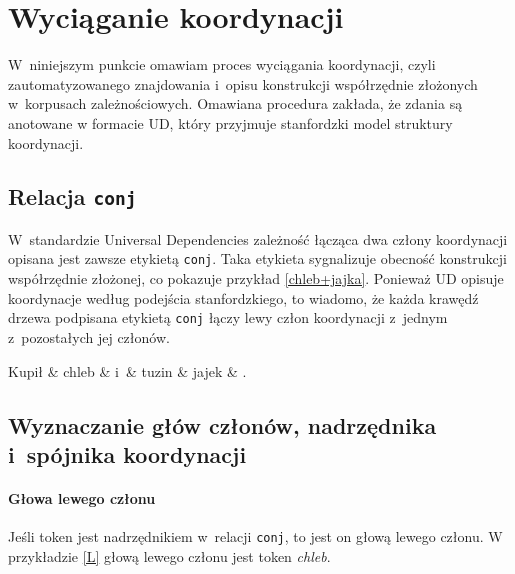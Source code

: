 \section{Wyciąganie koordynacji}

W~niniejszym punkcie omawiam proces wyciągania koordynacji, czyli zautomatyzowanego znajdowania i~opisu konstrukcji współrzędnie złożonych w~korpusach zależnościowych. Omawiana procedura zakłada, że zdania są anotowane w formacie UD, który przyjmuje stanfordzki model struktury koordynacji.

\subsection{Relacja \texttt{conj}}

W~standardzie Universal Dependencies zależność łącząca dwa człony koordynacji opisana jest zawsze etykietą \texttt{conj}. Taka etykieta sygnalizuje obecność konstrukcji współrzędnie złożonej, co pokazuje przykład \eqref{chleb+jajka}. Ponieważ UD opisuje koordynacje według podejścia stanfordzkiego, to wiadomo, że każda krawędź drzewa podpisana etykietą \texttt{conj} łączy lewy człon koordynacji z~jednym z~pozostałych jej członów.  
 
\begin{exe}
\ex \label{chleb+jajka}
\begin{dependency}[baseline=-\the\dimexpr\fontdimen22\textfont2\relax]
\begin{deptext}[column sep=1em]
Kupił \& chleb \& i~\& tuzin \& jajek \& .  \\ 
\end{deptext}
\end{dependency}
\end{exe}

\subsection{Wyznaczanie głów członów, nadrzędnika i~spójnika koordynacji}

\paragraph{Głowa lewego członu}

Jeśli token jest nadrzędnikiem w~relacji \texttt{conj}, to jest on głową lewego członu. W przykładzie \eqref{L} głową lewego członu jest token \textit{chleb}.

